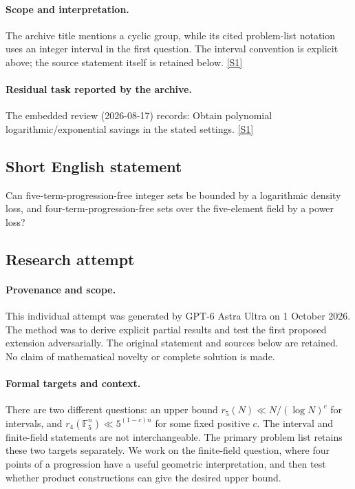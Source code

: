 \documentclass[11pt,a4paper]{article}
\newcommand{\F}{\mathbb{F}}
\newcommand{\sref}[2]{\hyperlink{source:#1:#2}{[S#2]}}
\begin{document}
\paragraph{Scope and interpretation.}

The archive title mentions a cyclic group, while its cited problem-list notation uses an integer interval in the first question. The interval convention is explicit above; the source statement itself is retained below. \sref{99}{1}

\paragraph{Residual task reported by the archive.}

The embedded review (2026-08-17) records: Obtain polynomial logarithmic/exponential savings in the stated settings. \sref{99}{1}

\subsection{Short English statement}

Can five-term-progression-free integer sets be bounded by a logarithmic density loss, and four-term-progression-free sets over the five-element field by a power loss?

\subsection{Research attempt}

\paragraph{Provenance and scope.}
This individual attempt was generated by GPT-6 Astra Ultra on 1 October 2026. The method was to derive explicit partial results and test the first proposed extension adversarially. The original statement and sources below are retained. No claim of mathematical novelty or complete solution is made.

\paragraph{Formal targets and context.}
There are two different questions: an upper bound $r_5(N)\ll N/(\log N)^c$ for intervals, and $r_4(\F_5^n)\ll5^{(1-c)n}$ for some fixed positive $c$. The interval and finite-field statements are not interchangeable. The primary problem list retains these two targets separately. We work on the finite-field question, where four points of a progression have a useful geometric interpretation, and then test whether product constructions can give the desired upper bound.
\end{document}
